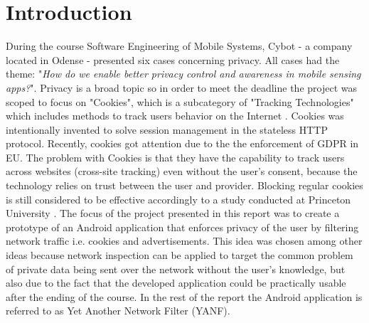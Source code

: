 \documentclass[main.tex]{subfiles}
\begin{document}
\section{Introduction}







During the course Software Engineering of Mobile Systems, Cybot - a company located in Odense - presented six cases concerning privacy. All cases had the theme: "\textit{How do we enable better privacy control and awareness in mobile sensing apps?}". Privacy is a broad topic so in order to meet the deadline the project was scoped to focus on "Cookies", which is a subcategory of "Tracking Technologies" which includes methods to track users behavior on the Internet \cite{CookieBotHowCookiebot}. Cookies was intentionally invented to solve session management in the stateless HTTP protocol. Recently, cookies got attention due to the the enforcement of GDPR in EU. The problem with Cookies is that they have the capability to track users across websites (cross-site tracking) even without the user's consent, because the technology relies on trust between the user and provider. Blocking regular cookies is still considered to be effective accordingly to a study conducted at Princeton University \cite{Englehardt2016OnlineAnalysis}. The focus of the project presented in this report was to create a prototype of an Android application that enforces privacy of the user by filtering network traffic i.e. cookies and advertisements. This idea was chosen among other ideas because network inspection can be applied to target the common problem of private data being sent over the network without the user's knowledge, but also due to the fact that the developed application could be practically usable after the ending of the course. In the rest of the report the Android application is referred to as Yet Another Network Filter (YANF).
\end{document}
